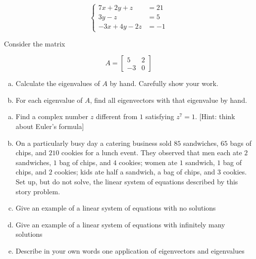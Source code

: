 \documentclass[11pt]{exam}
\theoremstyle{definition}
\begin{document}
\begin{questions}
\begin{enumerate}[(a)]
$$\left\lbrace\begin{array}{cc}
7x + 2y + z &= 21\\
3y-z &= 5\\
-3x + 4y-2z &= -1
\end{array}\right.$$
\end{enumerate}

\newpage
\question[10]\mbox{}
Consider the matrix

$$A = \left[\begin{array}{cc}5 & 2\\ -3 & 0\end{array}\right]$$

\begin{enumerate}[(a)]
\item Calculate the eigenvalues of $A$ by hand.  Carefully show your work.
\vspace{2.5in}
\item For each eigenvalue of $A$, find all eigenvectors with that eigenvalue by hand.
\end{enumerate}

\newpage
\question[10]\mbox{}
\begin{enumerate}[(a)]
\item Find a complex number $z$ different from $1$ satisfying $z^7=1$.  [Hint: think about Euler's formula]
\vspace{2.0in}
\item On a particularly busy day a catering business sold $85$ sandwiches, $65$ bags of chips, and $210$ cookies for a lunch event.  They observed that men each ate $2$ sandwiches, $1$ bag of chips, and $4$ cookies; women ate $1$ sandwich, $1$ bag of chips, and $2$ cookies; kids ate half a sandwich, a bag of chips, and $3$ cookies.  Set up, but do not solve, the linear system of equations described by this story problem.
\vspace{2.0in}
\item Give an example of a linear system of equations with no solutions
\vspace{1.0in}
\item Give an example of a linear system of equations with infinitely many solutions
\vspace{1.0in}
\item Describe in your own words one application of eigenvectors and eigenvalues 
\end{enumerate}
\end{questions}
\end{document}
